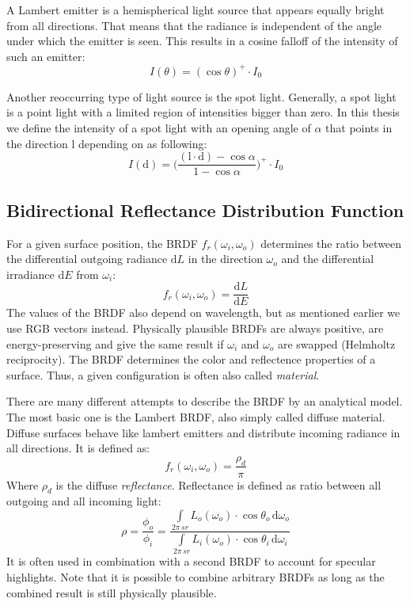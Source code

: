 \documentclass[thesis.tex]{subfiles}
\begin{document}
A Lambert emitter is a hemispherical light source that appears equally bright from all directions.
That means that the radiance is independent of the angle under which the emitter is seen.
This results in a cosine falloff of the intensity of such an emitter:
\begin{equation}
I(\theta) = (\cos\theta)^+ \cdot I_0
\end{equation}

Another reoccurring type of light source is the spot light.
Generally, a spot light is a point light with a limited region of intensities bigger than zero.
In this thesis we define the intensity of a spot light with an opening angle of $\alpha$ that points in the direction $\mathrm{l}$ depending on as following:
\begin{equation}
I(\mathrm{d}) = \Big(\frac{(\mathrm{l} \cdot \mathrm{d}) - \cos\alpha }{1-\cos\alpha}\Big)^+ \cdot I_0
\end{equation}

\subsection{Bidirectional Reflectance Distribution Function}\label{sec:preq:brdf}
For a given surface position, the BRDF $f_r(\omega_i, \omega_o)$ determines the ratio between the differential outgoing radiance $\mathrm{d}L$ in the direction $\omega_o$ and the differential irradiance $\mathrm{d}E$ from $\omega_i$:
\begin{equation}
f_r(\omega_i, \omega_o) = \frac{\mathrm{d}L}{\mathrm{d}E}
\end{equation}
The values of the BRDF also depend on wavelength, but as mentioned earlier we use RGB vectors instead.
Physically plausible BRDFs are always positive, are energy-preserving and give the same result if $\omega_i$ and $\omega_o$ are swapped (Helmholtz reciprocity).
The BRDF determines the color and reflectence properties of a surface.
Thus, a given configuration is often also called \emph{material}.

There are many different attempts to describe the BRDF by an analytical model.
The most basic one is the Lambert BRDF, also simply called diffuse material.
Diffuse surfaces behave like lambert emitters and distribute incoming radiance in all directions.
It is defined as:
\begin{equation}
f_r(\omega_i, \omega_o) = \frac{\rho_d}{\pi}
\end{equation}
Where $\rho_d$ is the diffuse \emph{reflectance}.
Reflectance is defined as ratio between all outgoing and all incoming light:
\begin{equation}
\rho = \frac{\phi_o}{\phi_i} = \frac{\int\limits_{2\pi\,sr} L_o(\omega_o)\cdot \cos\theta_o  \, \mathrm{d}\omega_o}{\int\limits_{2\pi\,sr} L_i(\omega_o)\cdot \cos\theta_i  \, \mathrm{d}\omega_i}
\end{equation}
It is often used in combination with a second BRDF to account for specular highlights.
Note that it is possible to combine arbitrary BRDFs as long as the combined result is still physically plausible.
\end{document}
